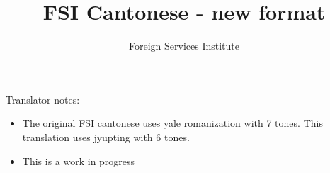 \documentclass[UTF8]{ctexart}
\begin{document}
\title{FSI Cantonese - new format}
\author{Foreign Services Institute}

\maketitle

\tableofcontents

\newpage
Translator notes:
\begin{itemize}
    \item The original FSI cantonese uses yale romanization with 7 tones. This translation uses jyupting with 6 tones.
    \item This is a work in progress
\end{itemize}




\end{document}
